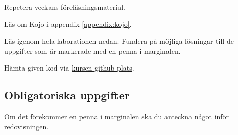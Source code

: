 
\Lab{\LabWeekONE}
%
\begin{Goals}

\end{Goals}

\begin{Preparations}
\item Repetera veckans föreläsningsmaterial.
\item {}%
\item Läs om Kojo i appendix \ref{appendix:kojo}.
\item Läs igenom hela laborationen nedan. Fundera på möjliga lösningar till de uppgifter som är markerade med en penna i marginalen.
\item Hämta given kod via \href{https://github.com/lunduniversity/introprog/tree/master/workspace/}{kursen github-plats}.
\end{Preparations}

\subsection{Obligatoriska uppgifter}

Om det förekommer en penna i marginalen ska du anteckna något inför redovisningen.


